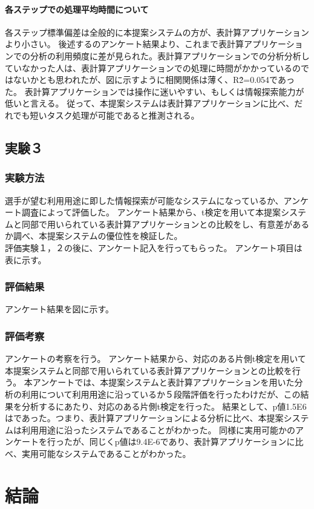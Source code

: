 \documentclass[sotsuron]{kuee}
\begin{document}
\subsubsection{各ステップでの処理平均時間について}
各ステップ標準偏差は全般的に本提案システムの方が、表計算アプリケーションより小さい。
後述するのアンケート結果より、これまで表計算アプリケーションでの分析の利用頻度に差が見られた。表計算アプリケーションでの分析分析していなかった人は、表計算アプリケーションでの処理に時間がかかっているのではないかとも思われたが、図に示すように相関関係は薄く、R\^2=0.054であった。
表計算アプリケーションでは操作に迷いやすい、もしくは情報探索能力が低いと言える。
従って、本提案システムは表計算アプリケーションに比べ、だれでも短いタスク処理が可能であると推測される。
\section{実験３}
\subsection{実験方法}
選手が望む利用用途に即した情報探索が可能なシステムになっているか、アンケート調査によって評価した。
アンケート結果から、t検定を用いて本提案システムと同部で用いられている表計算アプリケーションとの比較をし、有意差があるか調べ、本提案システムの優位性を検証した。
\\評価実験１，２の後に、アンケート記入を行ってもらった。
アンケート項目は表に示す。
\subsection{評価結果}
アンケート結果を図に示す。
\subsection{評価考察}
アンケートの考察を行う。
アンケート結果から、対応のある片側t検定を用いて本提案システムと同部で用いられている表計算アプリケーションとの比較を行う。
本アンケートでは、本提案システムと表計算アプリケーションを用いた分析の利用について利用用途に沿っているか５段階評価を行ったわけだが、この結果を分析するにあたり、対応のある片側t検定を行った。
結果として、p値1.5E\-6はであった。つまり、表計算アプリケーションによる分析に比べ、本提案システムは利用用途に沿ったシステムであることがわかった。
同様に実用可能かのアンケートを行ったが、同じくp値は9.4E-6であり、表計算アプリケーションに比べ、実用可能なシステムであることがわかった。
\chapter{結論}
\end{document}
